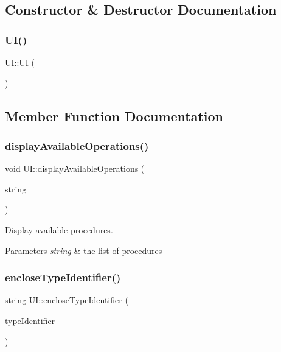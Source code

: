 \subsection{Constructor \& Destructor Documentation}
\mbox{\label{classUI_a675985a56b5e87ebdc8e5884b9f2ee09}} 
\subsubsection{\texorpdfstring{U\+I()}{UI()}}
{\footnotesize\ttfamily U\+I\+::\+UI (\begin{DoxyParamCaption}{ }\end{DoxyParamCaption})}



\subsection{Member Function Documentation}
\mbox{\label{classUI_abf905b724c7da571a7aa7b8e1a61e409}} 
\subsubsection{\texorpdfstring{display\+Available\+Operations()}{displayAvailableOperations()}}
{\footnotesize\ttfamily void U\+I\+::display\+Available\+Operations (\begin{DoxyParamCaption}\item[{string}]{string }\end{DoxyParamCaption})\hspace{0.3cm}{\ttfamily [private]}}

Display available procedures. 
\begin{DoxyParams}{Parameters}
{\em string} & the list of procedures \\
\hline
\end{DoxyParams}
\mbox{\label{classUI_a11fde47951c6781036418b9b2dd282ff}} 
\subsubsection{\texorpdfstring{enclose\+Type\+Identifier()}{encloseTypeIdentifier()}}
{\footnotesize\ttfamily string U\+I\+::enclose\+Type\+Identifier (\begin{DoxyParamCaption}\item[{string}]{type\+Identifier }\end{DoxyParamCaption})\hspace{0.3cm}{\ttfamily [private]}}

